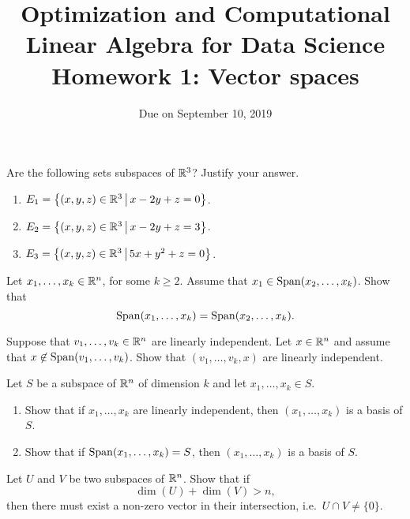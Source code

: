 \documentclass[11pt,nocut]{article}
\title{\vspace{-2.0cm}%
	Optimization and Computational Linear Algebra for Data Science\\
Homework 1: Vector spaces}
\date{\vspace{-1cm}Due on September 10, 2019}
\begin{document}
\maketitle


\begin{problem}[3 points]
	Are the following sets subspaces of $\mathbb{R}^3$? Justify your answer.
	\begin{enumerate}[label=\normalfont(\textbf{\alph*})]
		\item $E_1= \big\{ (x,y,z) \in \mathbb{R}^3 \, \big| \, x - 2y + z= 0 \big\}$.
		\item $E_2= \big\{ (x,y,z) \in \mathbb{R}^3 \, \big| \, x - 2y + z= 3 \big\}$.
		\item $E_3= \big\{ (x,y,z) \in \mathbb{R}^3 \, \big| \, 5x + y^2 + z= 0 \big\}$.
	\end{enumerate}
\end{problem}

\vspace{1mm}

\begin{problem}[2 points]\label{prob:rem_vector}
	Let $x_1, \dots, x_k \in \mathbb{R}^n$, for some $k \geq 2$. Assume that $x_1 \in {{\rm Span}}(x_2, \dots, x_k)$. Show that
	$$
	{{\rm Span}}(x_1, \dots, x_k) = {{\rm Span}}(x_2, \dots, x_k).
	$$
\end{problem}

\vspace{1mm}

\begin{problem}[2 points]\label{prob:add_vector}
	Suppose that $v_1, \dots, v_k \in \mathbb{R}^n$ are linearly independent. Let $x \in \mathbb{R}^n$ and assume that $x \not\in {{\rm Span}}(v_1,\dots, v_k)$.
	Show that $(v_1,\dots,v_k,x)$ are linearly independent.
\end{problem}

\vspace{1mm}

\begin{problem}[3 points]
	Let $S$ be a subspace of $\mathbb{R}^n$ of dimension $k$ and let $x_1, \dots, x_k \in S$.
	\begin{enumerate}[label=\normalfont(\textbf{\alph*})]
		\item Show that if $x_1, \dots, x_k$ are linearly independent, then $(x_1, \dots, x_k)$ is a basis of $S$.
		\item Show that if ${{\rm Span}}(x_1, \dots, x_k) = S$, then $(x_1, \dots, x_k)$ is a basis of $S$.
	\end{enumerate}
\end{problem}

\vspace{1mm}

\begin{problem}[$\star$]
	Let $U$ and $V$ be two subspaces of $\mathbb{R}^n$. Show that if
	$$
	\dim(U) + \dim(V) > n,
	$$
	then there must exist a non-zero vector in their intersection, i.e.\ $U \cap V \neq \{0\}$.
\end{problem}
\vspace{1cm}
\centerline{}

%
%
\end{document}
